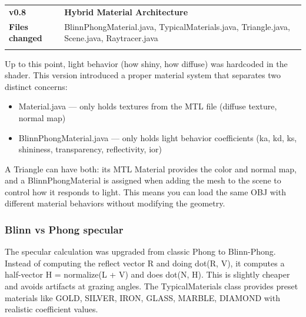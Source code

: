 \documentclass[
]{article}
\newcounter{none} %
\begin{document}
{\def\LTcaptype{none} %
\begin{longtable}[]{@{}
  >{\raggedright\arraybackslash}p{}
  >{\raggedright\arraybackslash}p{}@{}}
\toprule\noalign{}
\begin{minipage}[b]{\linewidth}\raggedright
\textbf{v0.8}
\end{minipage} & \begin{minipage}[b]{\linewidth}\raggedright
\textbf{Hybrid Material Architecture}
\end{minipage} \\
\begin{minipage}[b]{\linewidth}\raggedright
\textbf{Files changed}
\end{minipage} & \begin{minipage}[b]{\linewidth}\raggedright
BlinnPhongMaterial.java, TypicalMaterials.java, Triangle.java,
Scene.java, Raytracer.java
\end{minipage} \\
\midrule\noalign{}
\endhead
\bottomrule\noalign{}
\endlastfoot
\end{longtable}
}

Up to this point, light behavior (how shiny, how diffuse) was hardcoded
in the shader. This version introduced a proper material system that
separates two distinct concerns:

\begin{itemize}
\item
  Material.java --- only holds textures from the MTL file (diffuse
  texture, normal map)
\item
  BlinnPhongMaterial.java --- only holds light behavior coefficients
  (ka, kd, ks, shininess, transparency, reflectivity, ior)
\end{itemize}

A Triangle can have both: its MTL Material provides the color and normal
map, and a BlinnPhongMaterial is assigned when adding the mesh to the
scene to control how it responds to light. This means you can load the
same OBJ with different material behaviors without modifying the
geometry.

\subsubsection{\texorpdfstring{\textbf{Blinn vs Phong
specular}}{Blinn vs Phong specular}}\label{blinn-vs-phong-specular}

The specular calculation was upgraded from classic Phong to Blinn-Phong.
Instead of computing the reflect vector R and doing dot(R, V), it
computes a half-vector H = normalize(L + V) and does dot(N, H). This is
slightly cheaper and avoids artifacts at grazing angles. The
TypicalMaterials class provides preset materials like GOLD, SILVER,
IRON, GLASS, MARBLE, DIAMOND with realistic coefficient values.
\end{document}

